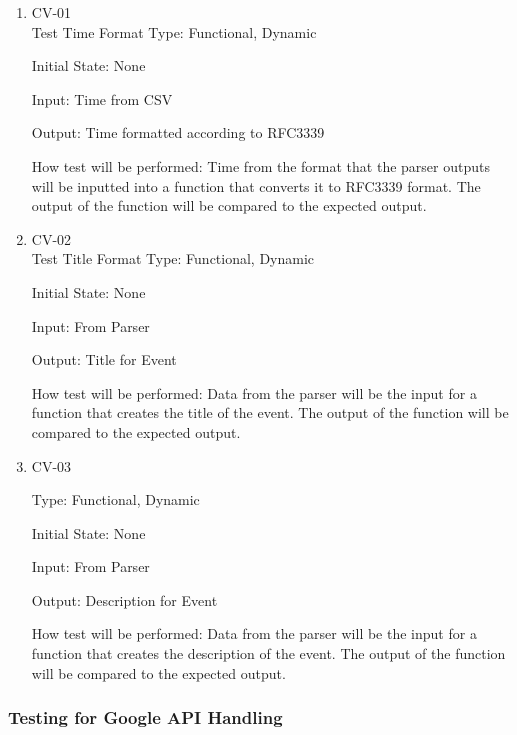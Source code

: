 \documentclass[12pt, titlepage]{article}
\begin{document}
\begin{enumerate}

\item{CV-01\\}
Test Time Format
Type: Functional, Dynamic
					
Initial State: None
					
Input: Time from CSV
					
Output: Time formatted according to RFC3339
					
How test will be performed: 
Time from the format that the parser outputs will be inputted into a function that converts it to RFC3339 format. The output of the function will be compared to the expected output. 

\item{CV-02\\}
Test Title Format
Type: Functional, Dynamic
					
Initial State: None
					
Input: From Parser
					
Output: Title for Event
					
How test will be performed: 
Data from the parser will be the input for a function that creates the title of the event. 
The output of the function will be compared to the expected output.

\item{CV-03\\}

Type: Functional, Dynamic
					
Initial State: None
					
Input: From Parser
					
Output: Description for Event
					
How test will be performed: 
Data from the parser will be the input for a function that creates the description of the event. 
The output of the function will be compared to the expected output.
\end{enumerate}


\subsubsection{Testing for Google API Handling}
\end{document}

